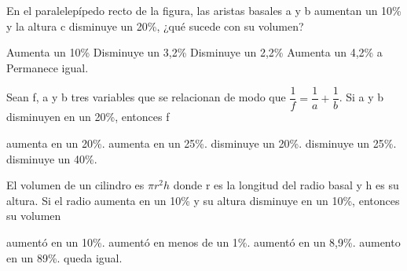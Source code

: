 \documentclass[pagina vacia]{srs}
\begin{document}
\begin{preguntas}[after-item-skip=2cm]
\pregunta En el paralelepípedo recto de la figura, las aristas basales a y b aumentan un 10\% y la altura c disminuye un 20\%, ¿qué sucede con su volumen?
\begin{vertical}
\alternativa Aumenta un 10\%
\alternativa Disminuye un 3,2\%
\alternativa Disminuye un 2,2\%
\alternativa Aumenta un 4,2\% a
\alternativa Permanece igual.
\end{vertical}

\pregunta Sean f, a y b tres variables que se relacionan de modo que \( \dfrac{1}{f} = \dfrac{1}{a} + \dfrac{1}{b} \). Si a y b disminuyen en un 20\%, entonces f
\begin{vertical}
\alternativa aumenta en un 20\%.
\alternativa aumenta en un 25\%.
\alternativa disminuye un 20\%.
\alternativa disminuye un 25\%.
\alternativa disminuye un 40\%.
\end{vertical}

\pregunta El volumen de un cilindro es \( \pi r^2 h \) donde r es la longitud del radio basal y h es su altura. Si el radio aumenta en un 10\% y su altura disminuye en un 10\%, entonces su volumen
\begin{vertical}
\alternativa aumentó en un 10\%.
\alternativa aumentó en menos de un 1\%.
\alternativa aumentó en un 8,9\%.
\alternativa aumento en un 89\%.
\alternativa queda igual.
\end{vertical}


\end{preguntas}
\end{document}
